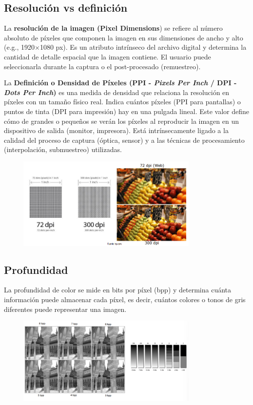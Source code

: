 \subsection{Resolución vs definición}
La \textbf{resolución de la imagen (Pixel Dimensions}) se refiere al número absoluto de píxeles que componen la imagen en sus dimensiones de ancho y alto (e.g., 1920×1080 px). Es un atributo intrínseco del archivo digital y determina la cantidad de detalle espacial que la imagen contiene. El usuario puede seleccionarla durante la captura o el post-procesado (remuestreo).

La \textbf{Definición o Densidad de Píxeles (PPI - \textit{Pixels Per Inch} / DPI - \textit{Dots Per Inch})} es una medida de densidad que relaciona la resolución en píxeles con un tamaño físico real. Indica cuántos píxeles (PPI para pantallas) o puntos de tinta (DPI para impresión) hay en una pulgada lineal. Este valor define cómo de grandes o pequeños se verán los píxeles al reproducir la imagen en un dispositivo de salida (monitor, impresora). Está intrínsecamente ligado a la calidad del proceso de captura (óptica, sensor) y a las técnicas de procesamiento (interpolación, submuestreo) utilizadas.

\begin{figure}[h]
\centering
\includegraphics[width = 0.8\textwidth]{figs/resolucion-definicion.png}
\end{figure}

\subsection{Profundidad}
La profundidad de color se mide en bits por píxel (bpp) y determina cuánta información puede almacenar cada píxel, es decir, cuántos colores o tonos de gris diferentes puede representar una imagen.

\begin{figure}[h]
\centering
\includegraphics[width = 0.8\textwidth]{figs/profundidad.png}
\end{figure}

